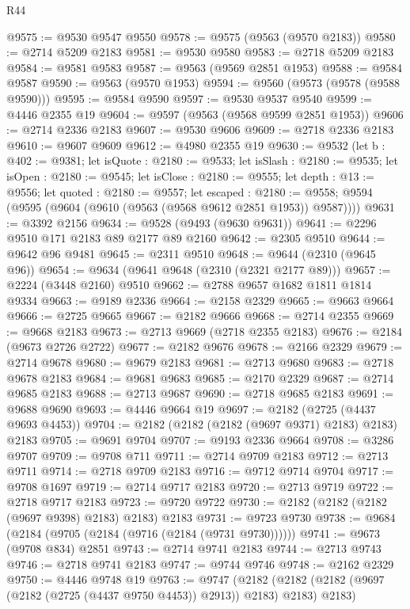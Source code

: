\begin{lexlean}{R44}
\begin{coremodule}
@9575 := @9530 @9547 @9550
@9578 := @9575 (@9563 (@9570 @2183))
@9580 := @2714 @5209 @2183
@9581 := @9530 @9580
@9583 := @2718 @5209 @2183
@9584 := @9581 @9583
@9587 := @9563 (@9569 @2851 @1953)
@9588 := @9584 @9587
@9590 := @9563 (@9570 @1953)
@9594 := @9560 (@9573 (@9578 (@9588 @9590)))
@9595 := @9584 @9590
@9597 := @9530 @9537 @9540
@9599 := @4446 @2355 @19
@9604 := @9597 (@9563 (@9568 @9599 @2851 @1953))
@9606 := @2714 @2336 @2183
@9607 := @9530 @9606
@9609 := @2718 @2336 @2183
@9610 := @9607 @9609
@9612 := @4980 @2355 @19
@9630 := @9532
    (let b : @402 := @9381;
    let isQuote : @2180 := @9533;
    let isSlash : @2180 := @9535;
    let isOpen : @2180 := @9545;
    let isClose : @2180 := @9555;
    let depth : @13 := @9556;
    let quoted : @2180 := @9557;
    let escaped : @2180 := @9558;
    @9594 (@9595 (@9604 (@9610 (@9563 (@9568 @9612 @2851 @1953)) @9587))))
@9631 := @3392 @2156
@9634 := @9528 (@9493 (@9630 @9631))
@9641 := @2296 @9510 @171 @2183 @89 @2177 @89 @2160
@9642 := @2305 @9510
@9644 := @9642 @96 @9481
@9645 := @2311 @9510
@9648 := @9644 (@2310 (@9645 @96))
@9654 := @9634 (@9641 @9648 (@2310 (@2321 @2177 @89)))
@9657 := @2224 (@3448 @2160) @9510
@9662 := @2788 @9657 @1682 @1811 @1814 @9334
@9663 := @9189 @2336
@9664 := @2158 @2329
@9665 := @9663 @9664
@9666 := @2725 @9665
@9667 := @2182 @9666
@9668 := @2714 @2355
@9669 := @9668 @2183
@9673 := @2713 @9669 (@2718 @2355 @2183)
@9676 := @2184 (@9673 @2726 @2722)
@9677 := @2182 @9676
@9678 := @2166 @2329
@9679 := @2714 @9678
@9680 := @9679 @2183
@9681 := @2713 @9680
@9683 := @2718 @9678 @2183
@9684 := @9681 @9683
@9685 := @2170 @2329
@9687 := @2714 @9685 @2183
@9688 := @2713 @9687
@9690 := @2718 @9685 @2183
@9691 := @9688 @9690
@9693 := @4446 @9664 @19
@9697 := @2182 (@2725 (@4437 @9693 @4453))
@9704 := @2182 (@2182 (@2182 (@9697 @9371) @2183) @2183) @2183
@9705 := @9691 @9704
@9707 := @9193 @2336 @9664
@9708 := @3286 @9707
@9709 := @9708 @711
@9711 := @2714 @9709 @2183
@9712 := @2713 @9711
@9714 := @2718 @9709 @2183
@9716 := @9712 @9714 @9704
@9717 := @9708 @1697
@9719 := @2714 @9717 @2183
@9720 := @2713 @9719
@9722 := @2718 @9717 @2183
@9723 := @9720 @9722
@9730 := @2182 (@2182 (@2182 (@9697 @9398) @2183) @2183) @2183
@9731 := @9723 @9730
@9738 := @9684 (@2184 (@9705 (@2184 (@9716 (@2184 (@9731 @9730))))))
@9741 := @9673 (@9708 @834) @2851
@9743 := @2714 @9741 @2183
@9744 := @2713 @9743
@9746 := @2718 @9741 @2183
@9747 := @9744 @9746
@9748 := @2162 @2329
@9750 := @4446 @9748 @19
@9763 := @9747
    (@2182 (@2182 (@2182 (@9697 (@2182 (@2725 (@4437 @9750 @4453)) @2913)) @2183) @2183) @2183)

\end{coremodule}
\end{lexlean}
